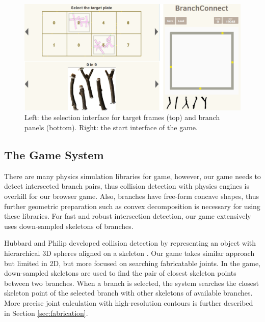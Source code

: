 \begin{figure}[H]
  \begin{center}
    \includegraphics[width = 0.4\paperwidth]{images/interface/game_interface.png}
    \caption{Left: the selection interface for target frames (top) and branch panels (bottom). Right: the start interface of the game.}
    \label{fig:game_interface}
  \end{center}
\end{figure}
%
\subsection{The Game System}
There are many physics simulation libraries for game, however, our game needs to detect intersected branch pairs, thus collision detection with physics engines is overkill for our browser game.
Also, branches have free-form concave shapes, thus further geometric preparation such as convex decomposition is necessary for using these libraries.
For fast and robust intersection detection, our game extensively uses down-sampled skeletons of branches.

Hubbard and Philip developed collision detection by representing an object with hierarchical 3D spheres aligned on a skeleton \cite{Hubbard:1996:APS:231731.231732}.
Our game takes similar approach but limited in 2D, but more focused on searching fabricatable joints.
In the game, down-sampled skeletons are used to find the pair of closest skeleton points between two branches.
When a branch is selected, the system searches the closest skeleton point of the selected branch with other skeletons of available branches.
More precise joint calculation with high-resolution contours is further described in Section \ref{sec:fabrication}.




